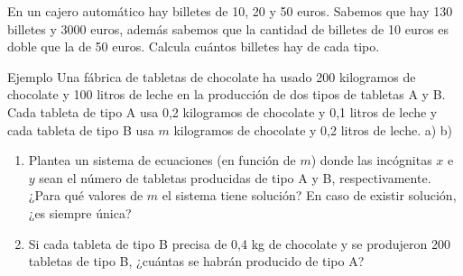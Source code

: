 \documentclass[9pt]{beamer}
\begin{document}
\begin{frame}
En un cajero automático hay billetes de 10, 20 y 50 euros. Sabemos que hay 130 billetes y 3000 euros, además sabemos que la cantidad de billetes de 10 euros es doble que la de 50 euros. Calcula cuántos billetes hay de cada tipo.
\end{frame}

\begin{frame}
\begin{exampleblock}{Ejemplo}
Una fábrica de tabletas de chocolate ha usado 200 kilogramos de chocolate y 100 litros de leche en la producción de dos tipos de tabletas A y B. Cada tableta de tipo A usa 0,2 kilogramos de chocolate y 0,1 litros de leche y cada tableta de tipo B usa $m$ kilogramos de chocolate y 0,2 litros de leche.
a) 
b) 
\begin{enumerate}
\item Plantea un sistema de ecuaciones (en función de $m$) donde las incógnitas $x$ e $y$ sean el número de tabletas producidas de tipo A y B, respectivamente. ¿Para qué valores de $m$ el sistema tiene solución? En caso de existir solución, ¿es siempre única?
\item Si cada tableta de tipo B precisa de 0,4 kg de chocolate y se produjeron 200 tabletas de tipo B, ¿cuántas se habrán producido de tipo A?
\end{enumerate}

\end{exampleblock}
\end{frame}
\end{document}
